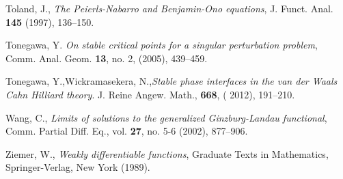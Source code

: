 \begin{thebibliography}{9}
Toland, J., \textit{The Peierls-Nabarro and Benjamin-Ono equations}, J. Funct. Anal. \textbf{145} (1997),
136–150.

Tonegawa, Y. \textit{On stable critical points for a singular perturbation problem}, Comm. Anal. Geom. \textbf{13}, no. 2, (2005), 439–459.

Tonegawa, Y.,Wickramasekera, N.,\textit{Stable phase interfaces in the van der Waals Cahn Hilliard theory}. J. Reine Angew. Math., \textbf{668}, ( 2012), 191–210.

Wang, C., \textit{Limits of solutions to the generalized Ginzburg-Landau functional}, Comm. Partial
Diff. Eq., vol. \textbf{27}, no. 5-6 (2002), 877–906.

Ziemer, W., \textit{Weakly differentiable functions}, Graduate Texts in Mathematics, Springer-Verlag, New York (1989).


\end{thebibliography}